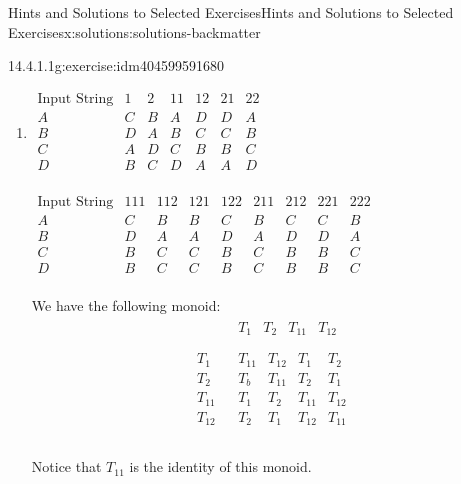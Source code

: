 \documentclass[twoside,10pt,]{book}
\numberwithin{equation}{section}
\begin{document}
\begin{solutions-chapter}{Hints and Solutions to Selected Exercises}{}{Hints and Solutions to Selected Exercises}{}{}{x:solutions:solutions-backmatter}
\begin{divisionsolution}{14.4.1.1}{}{g:exercise:idm404599591680}
\begin{enumerate}[label=(\alph*)]
\item{}\(\begin{array}{c|cccccc}
\textrm{Input String} & 1 & 2  &  11 & 12 & 21 & 22 \\
\hline
A & C & B & A & D & D & A \\
B &  D & A & B & C & C & B \\
C & A & D & C & B & B & C \\
D &  B & C & D & A & A & D \\
\end{array}\)%
\par
\(\begin{array}{c|cccccccc}
\textrm{Input String} &111 & 112 & 121 & 122 & 211 & 212 & 221 & 222 \\
\hline
A & C & B & B & C & B & C & C & B \\
B  & D & A & A &  D & A & D & D & A \\
C  & B & C & C & B & C & B & B & C \\
D  & B & C & C & B & C & B & B & C \\
\end{array}\)%
\par
We have the following monoid:%
\begin{equation*}
\begin{array}{c|c}
& 
\begin{array}{cccc}
T_1 &  T_2 & T_{11} &  T_{12} \\
\end{array}
\\
\hline
\begin{array}{c}
T_1 \\
T_2 \\
T_{11} \\
T_{12} \\
\end{array}
& 
\begin{array}{cccc}
T_{11} & T_{12} & T_1 & T_2 \\
T_b & T_{11} & T_2 & T_1 \\
T_1 & T_2 & T_{11} & T_{12} \\
T_2 & T_1 & T_{12} & T_{11} \\
\end{array}
\\
\end{array}
\end{equation*}
%
\par
Notice that \(T_{11}\) is the identity of this monoid.%
\end{enumerate}
%
\end{divisionsolution}%

\end{solutions-chapter}
\end{document}

